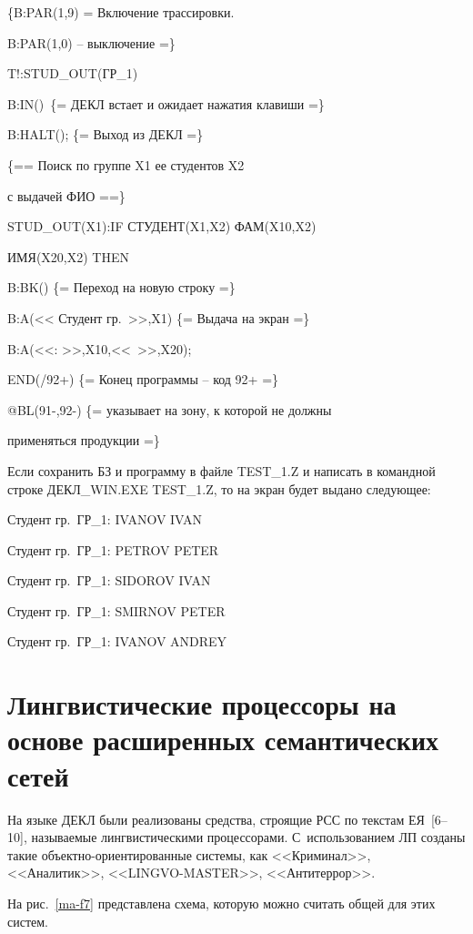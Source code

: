 \begin{multicols}{2}
{\noindent
 \{B:PAR(1,9) = Включение трассировки.

  B:PAR(1,0) -- выключение =\}

\noindent
 T!:STUD\_OUT(ГР\_1)

\noindent
 B:IN()\ \{= ДЕКЛ встает и ожидает нажатия клавиши =\}

\noindent
 B:HALT(); \{= Выход из ДЕКЛ =\}

\noindent
 \{== Поиск по группе X1 ее студентов X2

  с выдачей ФИО ==\}

\noindent
 STUD\_OUT(X1):IF СТУДЕНТ(X1,X2) ФАМ(X10,X2)

  ИМЯ(X20,X2) THEN

\noindent
 B:BK() \{= Переход на новую строку =\}

\noindent
 B:A(<< Студент гр.\ >>,X1) \{= Выдача на экран =\}

\noindent
 B:A(<<: >>,X10,<<\ >>,X20);

\noindent
 END(/92+) \{= Конец программы -- код 92+ =\}

\noindent
 @BL(91-,92-) \{= указывает на зону, к которой не должны

  применяться продукции =\}

 }

 Если сохранить БЗ и программу в файле TEST\_1.Z и написать в
командной строке ДЕКЛ\_WIN.EXE TEST\_1.Z, то на экран будет выдано
следующее:

 Студент гр.\ ГР\_1: IVANOV IVAN

 Студент гр.\ ГР\_1: PETROV PETER

 Студент гр.\ ГР\_1: SIDOROV IVAN

 Студент гр.\ ГР\_1: SMIRNOV PETER

 Студент гр.\ ГР\_1: IVANOV ANDREY


\vspace*{-6pt}

\section{Лингвистические процессоры на основе расширенных
семантических сетей} %

 На языке ДЕКЛ были реализованы средства, строящие РСС по текстам
ЕЯ~[6--10], назы\-ва\-емые лингвистическими процессорами.
С~использованием ЛП созданы такие
объ\-ект\-но-ори\-ен\-ти\-ро\-ван\-ные системы, как <<Криминал>>,
<<Аналитик>>, <<LINGVO-MASTER>>, <<Антитеррор>>.

 На рис.~\ref{ma-f7} представлена схема, которую можно считать общей
для этих систем.


\end{multicols}
